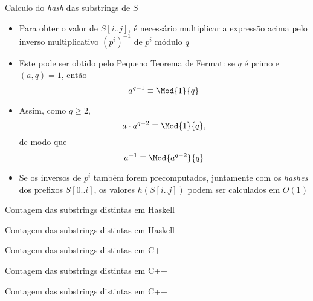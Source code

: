 \begin{frame}[fragile]{Calculo do {\it hash} das substrings de $S$}

    \begin{itemize}
        \item Para obter o valor de $S[i..j]$, é necessário multiplicar a expressão acima
            pelo inverso multiplicativo $(p^i)^{-1}$ de $p^i$ módulo $q$

        \item Este pode ser obtido pelo Pequeno Teorema de Fermat: se $q$ é primo e 
        $(a, q) = 1$, então
        \[
            a^{q-1}\equiv \Mod{1}{q}
        \]

        \item Assim, como $q \geq 2$,
        \[
            a\cdot a^{q-2}\equiv \Mod{1}{q},
        \]
        de modo que 
        \[
            a^{-1}\equiv \Mod{a^{q-2}}{q}
        \]

        \item Se os inversos de $p^i$ também forem precomputados, juntamente com os 
        \textit{hashes} dos prefixos $S[0..i]$, os valores $h(S[i..j])$ podem ser calculados
        em $O(1)$
    \end{itemize}

\end{frame}

\begin{frame}[fragile]{Contagem das substrings distintas em Haskell}
\end{frame}

\begin{frame}[fragile]{Contagem das substrings distintas em Haskell}
\end{frame}

\begin{frame}[fragile]{Contagem das substrings distintas em C++}
\end{frame}

\begin{frame}[fragile]{Contagem das substrings distintas em C++}
\end{frame}

\begin{frame}[fragile]{Contagem das substrings distintas em C++}
\end{frame}

